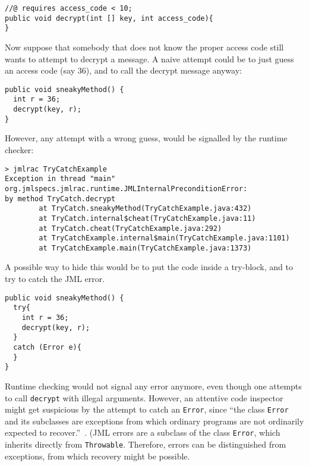 \documentclass[]{llncs}
\begin{document}
\begin{verbatim}
//@ requires access_code < 10;
public void decrypt(int [] key, int access_code){
}
\end{verbatim}


Now suppose that somebody that does not know the proper access code
still wants to attempt to decrypt a message. A naive attempt could be
to just guess an access code (say 36), and to call the decrypt message anyway:

\begin{verbatim}
public void sneakyMethod() {
  int r = 36; 
  decrypt(key, r);                                           
}
\end{verbatim}

However, any attempt with a wrong guess, would be signalled by the
runtime checker:
\begin{verbatim}
> jmlrac TryCatchExample
Exception in thread "main" 
org.jmlspecs.jmlrac.runtime.JMLInternalPreconditionError: 
by method TryCatch.decrypt
        at TryCatch.sneakyMethod(TryCatchExample.java:432)
        at TryCatch.internal$cheat(TryCatchExample.java:11)
        at TryCatch.cheat(TryCatchExample.java:292)
        at TryCatchExample.internal$main(TryCatchExample.java:1101)
        at TryCatchExample.main(TryCatchExample.java:1373)
\end{verbatim}

A possible way to hide this would be to put the code inside a
try-block, and to try to catch the JML error.

\begin{verbatim}
public void sneakyMethod() {
  try{ 
    int r = 36; 
    decrypt(key, r);                                           
  }           
  catch (Error e){
  }
}
\end{verbatim}
Runtime checking would not signal any error anymore, even though one
attempts to call \texttt{decrypt} with illegal arguments. However, an
attentive code inspector might get suspicious by the attempt to catch
an \texttt{Error}, since ``the class \texttt{Error} and its subclasses
are exceptions from which ordinary programs are not ordinarily
expected to recover.''~\cite[\S 11.5]{GoslingJSB05}. (JML errors are a
subclass of the class \texttt{Error}, which inherits directly from
\texttt{Throwable}. Therefore, errors can be distinguished from
exceptions, from which recovery might be possible.
\end{document}
